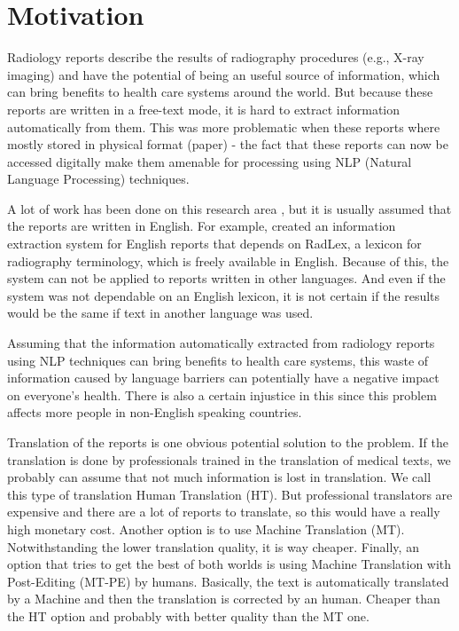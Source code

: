 \label{chap1}

\section{Motivation}
\label{motivation}

Radiology reports describe the results of radiography procedures (e.g., X-ray imaging) and have the potential of being an useful source of information, which can bring benefits to health care systems around the world. But because these reports are written in a free-text mode, it is hard to extract information automatically from them. This was more problematic when these reports where mostly stored in physical format (paper) - the fact that these reports can now be accessed digitally make them amenable for processing using NLP (Natural Language Processing) techniques. 

A lot of work has been done on this research area \citep{Pons2016}, but it is usually assumed that the reports are written in English. For example, \citep{Hassanpour2016} created an information extraction system for English reports that depends on RadLex, a lexicon for radiography terminology, which is freely available in English. Because of this, the system can not be applied to reports written in other languages. And even if the system was not dependable on an English lexicon, it is not certain if the results would be the same if text in another language was used.

Assuming that the information automatically extracted from radiology reports using NLP techniques can bring benefits to health care systems, this waste of information caused by language barriers can potentially have a negative impact on everyone's health. There is also a certain injustice in this since this problem affects more people in non-English speaking countries. 

Translation of the reports is one obvious potential solution to the problem. If the translation is done by professionals trained in the translation of medical texts, we probably can assume that not much information is lost in translation. We call this type of translation Human Translation (HT). But professional translators are expensive and there are a lot of reports to translate, so this would have a really high monetary cost. Another option is to use Machine Translation (MT). Notwithstanding the lower translation quality, it is way cheaper. Finally, an option that tries to get the best of both worlds is using Machine Translation with Post-Editing (MT-PE) by humans. Basically, the text is automatically translated by a Machine and then the translation is corrected by an human. Cheaper than the HT option and probably with better quality than the MT one. 

